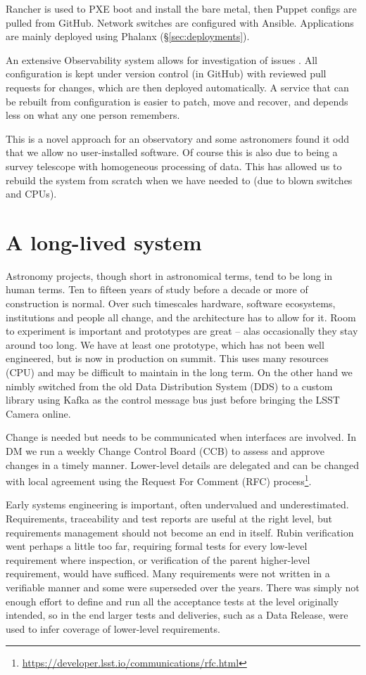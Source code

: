Rancher is used to PXE boot and install the bare metal, then Puppet configs are pulled from GitHub.
Network switches are configured with Ansible.
Applications are mainly deployed using Phalanx (\S\ref{sec:deployments}).

An extensive Observability system allows for investigation of issues \citep{2026SPIE14155E..0US}.
All configuration is kept under version control (in GitHub) with reviewed pull requests for changes, which are then deployed automatically.
A service that can be rebuilt from configuration is easier to patch, move and recover, and depends less on what any one person remembers.

This is a novel approach for an observatory and some astronomers found it odd that we allow no user-installed software.
Of course this is also due to being a survey telescope with homogeneous processing of data.
This has allowed us to rebuild the system from scratch when we have needed to (due to blown switches and CPUs).

\section{A long-lived system}
\label{sec:architecture}
 Astronomy projects, though short in astronomical terms, tend to be long in human terms.
Ten to fifteen years of study before a decade or more of construction is normal.
Over such timescales hardware, software ecosystems, institutions and people all change, and the architecture has to allow for it.
Room to experiment is important and prototypes are great -- alas occasionally they stay around too long.
We have at least one prototype, which has not been well engineered, but is now in production on summit.
This uses many resources (CPU) and may be difficult to maintain in the long term.
On the other hand we nimbly switched from the old Data Distribution System (DDS) to a custom library using Kafka as the control message bus \citep{2024SPIE13101E..18R} just before bringing the LSST Camera online.

Change is needed but needs to be communicated when interfaces are involved.
In DM we run a weekly Change Control Board (CCB) to assess and approve changes in a timely manner.
Lower-level details are delegated and can be changed with local agreement using
the Request For Comment (RFC) process\footnote{\url{https://developer.lsst.io/communications/rfc.html}}.

Early systems engineering is important, often undervalued and underestimated.
Requirements, traceability and test reports are useful at the right level, but requirements management should not become an end in itself.
Rubin verification went perhaps a little too far, requiring formal tests for every low-level requirement where inspection, or verification of the parent higher-level requirement, would have sufficed.
Many requirements were not written in a verifiable manner and some were superseded over the years.
There was simply not enough effort to define and run all the acceptance tests at the level originally intended, so in the end larger tests and deliveries, such as a Data Release, were used to infer coverage of lower-level requirements.


